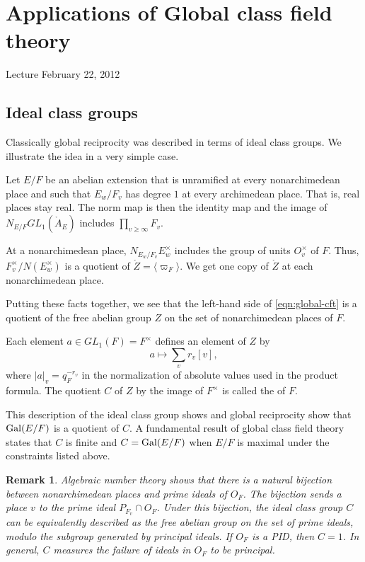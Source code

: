 \documentclass{amsart}
\newtheorem{remark}[equation]{Remark}
\def\AA{\ring{A}}
\def\oG{\op{Gal}}
\begin{document}
\section{Applications of Global class field theory}

Lecture February 22, 2012

\subsection{Ideal class groups}

Classically global reciprocity was described in terms of ideal class groups.  We illustrate
the idea in a very simple case.

Let $E/F$ be an abelian extension that is unramified at every nonarchimedean place
and such that $E_w/F_v$ has degree $1$ at every archimedean place.  That is,
real places stay real.  The norm map is then the identity map and the image of
$N_{E/F} GL_1(\AA_E)$ includes $\prod_{v\ge\infty} F_v$.

At a nonarchimedean place, $N_{E_w/F_v} E^\times_w$ includes the group
of units $O_v^\times$ of $F$.  Thus, $F_v^\times/N (E_w^\times)$ is a
quotient of $\ring{Z} = \langle \varpi_F\rangle$.  We get one copy of
$\ring{Z}$ at each nonarchimedean place.

Putting these facts together, we see that the left-hand side of
\eqref{eqn:global-cft} is a quotient of the free abelian group $Z$ on
the set of nonarchimedean places of $F$.

Each element $a\in GL_1(F)=F^\times$ defines an element of $Z$ by
\[
a \mapsto \sum_v r_v [v],
\]
where $|a|_v = q_F^{-r_v}$ in the normalization of absolute values
used in the product formula.  The quotient $C$ of $Z$ by the image of
$F^\times$ is called the  of $F$.

This description of the ideal class group shows and global reciprocity show
that $\oG(E/F)$ is a quotient of $C$.  A fundamental result of global class
field theory states that $C$ is finite and $C = \oG(E/F)$ when $E/F$ is
maximal under the constraints listed above.

\begin{remark} Algebraic number theory shows that there is a natural
bijection between  nonarchimedean places and prime ideals of $O_F$.
The bijection sends a place $v$ to the prime ideal $P_{F_v}\cap O_F$.
Under this bijection, the ideal class group $C$ can be equivalently described as
the free abelian group on the set of prime ideals, modulo the subgroup generated
by principal  ideals.  If $O_F$ is a PID, then $C=1$.  In general, $C$
measures the failure of ideals in $O_F$ to be principal.
\end{remark}
\end{document}
